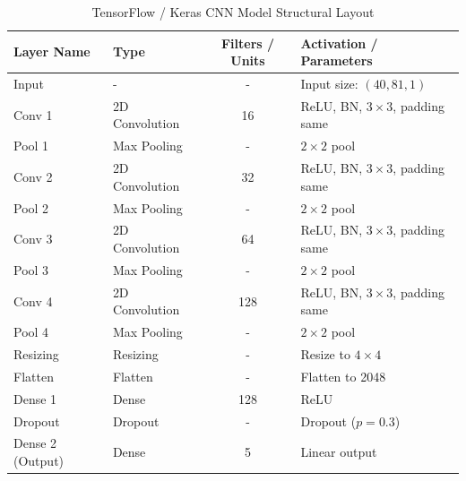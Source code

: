 \documentclass[11pt,a4paper]{article}
\begin{document}
\begin{table}[htbp]
    \vspace{0.8cm}

    \caption{TensorFlow / Keras CNN Model Structural Layout}
    \label{tab:tensorflow_structure}
    \begin{tabularx}{\textwidth}{llcL}
        \toprule
        \textbf{Layer Name} & \textbf{Type}  & \textbf{Filters / Units} & \textbf{Activation / Parameters}     \\
        \midrule
        Input               & -              & -                        & Input size: $(40, 81, 1)$            \\
        Conv 1              & 2D Convolution & 16                       & ReLU, BN, $3 \times 3$, padding same \\
        Pool 1              & Max Pooling    & -                        & $2 \times 2$ pool                    \\
        Conv 2              & 2D Convolution & 32                       & ReLU, BN, $3 \times 3$, padding same \\
        Pool 2              & Max Pooling    & -                        & $2 \times 2$ pool                    \\
        Conv 3              & 2D Convolution & 64                       & ReLU, BN, $3 \times 3$, padding same \\
        Pool 3              & Max Pooling    & -                        & $2 \times 2$ pool                    \\
        Conv 4              & 2D Convolution & 128                      & ReLU, BN, $3 \times 3$, padding same \\
        Pool 4              & Max Pooling    & -                        & $2 \times 2$ pool                    \\
        Resizing            & Resizing       & -                        & Resize to $4 \times 4$               \\
        Flatten             & Flatten        & -                        & Flatten to 2048                      \\
        Dense 1             & Dense          & 128                      & ReLU                                 \\
        Dropout             & Dropout        & -                        & Dropout ($p=0.3$)                    \\
        Dense 2 (Output)    & Dense          & 5                        & Linear output                        \\
        \bottomrule
    \end{tabularx}
\end{table}
\end{document}
